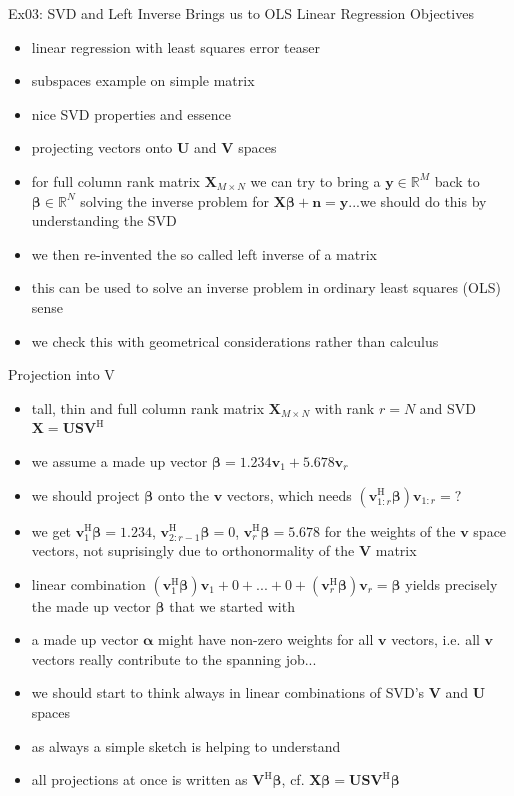 \documentclass[mathserif, aspectratio=1610]{intbeamer}
\begin{document}
\begin{frame}{Ex03: SVD and Left Inverse Brings us to OLS Linear Regression}
Objectives
\begin{itemize}
\item linear regression with least squares error teaser
\item subspaces example on simple matrix
\item nice SVD properties and essence
\item projecting vectors onto $\bm{U}$ and $\bm{V}$ spaces
\item for full column rank matrix $\bm{X}_{M \times N}$ we can try to bring a $\bm{y}\in \mathbb{R}^M$ back to $\bm{\beta}\in \mathbb{R}^N$ solving the inverse problem for $\bm{X} \bm{\beta} + \bm{n} = \bm{y}$...we should do this by understanding the SVD
\item we then re-invented the so called left inverse of a matrix
\item this can be used to solve an inverse problem in ordinary least squares (OLS) sense
\item we check this with geometrical considerations rather than calculus
\end{itemize}
\end{frame}







\begin{frame}{Projection into V}
\begin{itemize}
\item
tall, thin and full column rank matrix $\bm{X}_{M \times N}$ with rank $r=N$ and SVD $\bm{X} = \bm{U} \bm{S} \bm{V}^\mathrm{H}$
\item
we assume a made up vector $\bm{\beta} = 1.234 \bm{v}_1 + 5.678 \bm{v}_r$
\item
we should project $\bm{\beta}$ onto the $\bm{v}$ vectors, which needs $(\bm{v}_{1:r}^\mathrm{H} \bm{\beta}) \bm{v}_{1:r} = ?$
\item
we get $\bm{v}_{1}^\mathrm{H} \bm{\beta} = 1.234$, $\bm{v}_{2:r-1}^\mathrm{H} \bm{\beta} = 0$, $\bm{v}_{r}^\mathrm{H} \bm{\beta} = 5.678$ for the weights of the $\bm{v}$
space vectors, not suprisingly due to orthonormality of the $\bm{V}$ matrix
\item
linear combination $(\bm{v}_{1}^\mathrm{H} \bm{\beta})\bm{v}_1 + 0 + ... + 0 + (\bm{v}_{r}^\mathrm{H} \bm{\beta})\bm{v}_r = \bm{\beta}$ yields precisely the made up vector $\bm{\beta}$ that we started with
\item
a made up vector $\bm{\alpha}$ might have non-zero weights for all $\bm{v}$ vectors, i.e. all $\bm{v}$ vectors really contribute to the spanning job...
\item
we should start to think always in linear combinations of SVD's $\bm{V}$ and $\bm{U}$ spaces
\item
as always a simple sketch is helping to understand
\item
all projections at once is written as $\bm{V}^\mathrm{H} \bm{\beta}$, cf. $\bm{X}\bm{\beta} = \bm{U} \bm{S} \bm{V}^\mathrm{H}\bm{\beta}$
\end{itemize}
\end{frame}
\end{document}
